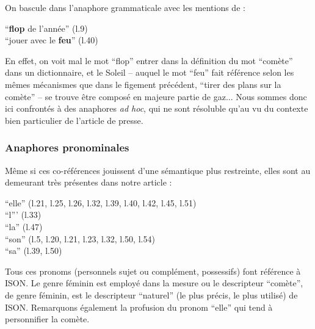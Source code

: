 \documentclass[a4paper,10pt]{article}
\begin{document}
			On bascule dans l'anaphore grammaticale avec les mentions de :
			\begin{center}
				\footnotesize
				\begin{minipage}{0.7\textwidth}
					``\textbf{flop} de l'année'' (l.9) \\
					``jouer avec le \textbf{feu}'' (l.40) \\
				\end{minipage}
			\end{center}
			En effet, on voit mal le mot ``flop'' entrer dans la définition du mot ``comète'' dans un dictionnaire, et le Soleil -- auquel le mot ``feu'' fait référence selon les mêmes mécanismes que dans le figement précédent, ``tirer des plans sur la comète'' -- se trouve être composé en majeure partie de gaz... Nous sommes donc ici confrontés à des anaphores \textit{ad hoc}, qui ne sont résoluble qu'au vu du contexte bien particulier de l'article de presse.
		\subsubsection{Anaphores pronominales}
			Même si ces co-références jouissent d'une sémantique plus restreinte, elles sont au demeurant très présentes dans notre article :
			\begin{center}
				\footnotesize
				\begin{minipage}{0.7\textwidth}
					``elle'' (l.21, l.25, l.26, l.32, l.39, l.40, l.42, l.45, l.51)\\
					``l''' (l.33)\\
					``la'' (l.47)\\
					``son'' (l.5, l.20, l.21, l.23, l.32, l.50, l.54)\\
					``sa'' (l.39, l.50)
				\end{minipage}
			\end{center}
			Tous ces pronoms (personnels sujet ou complément, possessifs) font référence à ISON. Le genre féminin est employé dans la mesure ou le descripteur ``comète'', de genre féminin, est le descripteur ``naturel'' (le plus précis, le plus utilisé) de ISON. Remarquons également la profusion du pronom ``elle'' qui tend à personnifier la comète.
\end{document}
